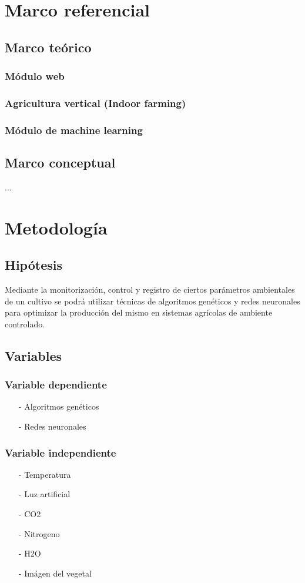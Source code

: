\documentclass{report}
\begin{document}
\chapter{Marco referencial}
\section{Marco teórico}
\subsection{Módulo web}
\subsection{Agricultura vertical (Indoor farming)}
\subsection{Módulo de machine learning}
\section{Marco conceptual}
...
\chapter{Metodología}
\section{Hipótesis}
Mediante la monitorización, control y registro de ciertos parámetros ambientales de
un cultivo se podrá utilizar técnicas de algoritmos genéticos y redes neuronales
para optimizar la producción del mismo en sistemas agrícolas de ambiente controlado.
\section{Variables}
\subsection{Variable dependiente}
\begin{enumerate}
\item[-] Algoritmos genéticos
\item[-] Redes neuronales
\end{enumerate}
\subsection{Variable independiente}
\begin{enumerate}
\item[-] Temperatura
\item[-] Luz artificial
\item[-] CO2
\item[-] Nitrogeno
\item[-] H2O
\item[-] Imágen del vegetal
\end{enumerate}
\end{document}
